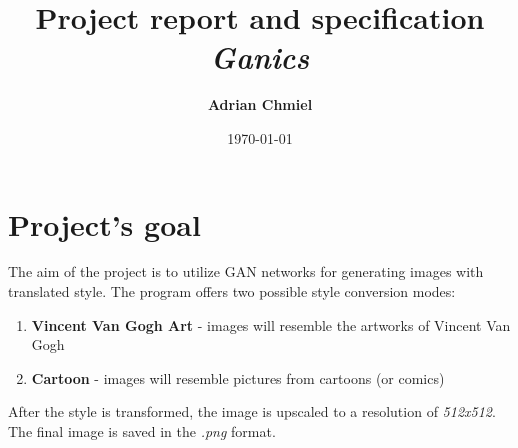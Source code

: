 \documentclass{article}
\begin{document}
\title{\textbf{Project report and specification}
\\ \large{\textit{Ganics}}}
\author{\textbf{Adrian Chmiel}}
\date{\today}
\maketitle

\section{Project's goal}
The aim of the project is to utilize GAN networks for generating images with translated style. The program offers two possible style conversion modes:
\begin{enumerate}[label=\arabic*.]
    \setlength\itemsep{0pt}
    \item \textbf{Vincent Van Gogh Art} - images will resemble the artworks of Vincent Van Gogh
    \item \textbf{Cartoon} - images will resemble pictures from cartoons (or comics)
\end{enumerate}
After the style is transformed, the image is upscaled to a resolution of \textit{512x512}. The final image is saved in the \textit{.png} format.
\end{document}
